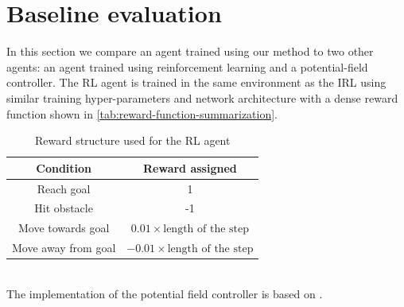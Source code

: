 \section{Baseline evaluation}
\label{sec:baseline-evaluation}
In this section we compare an agent trained using our method to two other agents: an agent trained using reinforcement learning and a potential-field controller. The RL agent is trained in the same environment as the IRL using similar training hyper-parameters and network architecture with a dense reward function shown in \autoref{tab:reward-function-summarization}.
\begin{table}[htbp]
    \begin{center}
        \renewcommand{\arraystretch}{1.3}
        \begin{tabular}{|c|c|}
        \hline
        \textbf{Condition} & \textbf{Reward assigned} \\
        \hline
        Reach goal & 1 \\
        Hit obstacle & -1 \\
        Move towards goal & $0.01 \times \text{length of the step}$ \\
        Move away from goal & $ -0.01 \times \text{length of the step}$\\
        \hline
        \end{tabular}
    \end{center}
    \caption{Reward structure used for the RL agent}
    \label{tab:reward-function-summarization}
\end{table}\\
The implementation of the potential field controller is based on \cite{khatib_1986}.\\  
